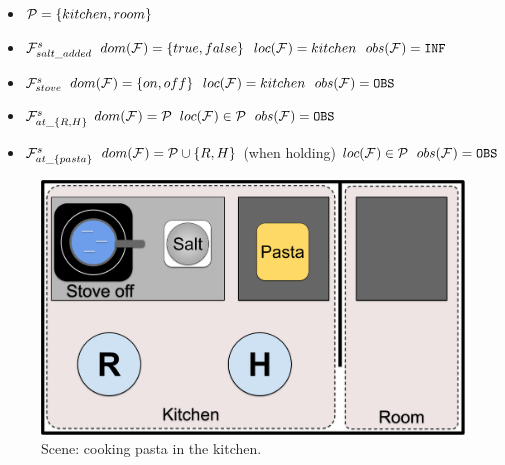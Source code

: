 \documentclass[letterpaper]{article} %
\begin{document}
\begin{itemize}
    \item $\mathcal{P} = \{ kitchen, room \}$
    
    \item $\mathcal{F}^{s}_{salt\_added}$
        \subitem $dom(\mathcal{F}^{}_{}) = \{ true, false \}$
        \subitem $loc(\mathcal{F}^{}_{}) = kitchen$
        \subitem $obs(\mathcal{F}^{}_{}) = \texttt{INF}$

    \item $\mathcal{F}^{s}_{stove}$
        \subitem $dom(\mathcal{F}^{}_{}) = \{ on, off \}$ 
        \subitem $loc(\mathcal{F}^{}_{}) = kitchen$ 
        \subitem $obs(\mathcal{F}^{}_{}) = \texttt{OBS}$ 
    
    \item $\mathcal{F}^{s}_{at\_\{R,H\}}$
        \subitem $dom(\mathcal{F}^{}_{}) = \mathcal{P}$ 
        \subitem $loc(\mathcal{F}^{}_{}) \in  \mathcal{P}$ 
        \subitem $obs(\mathcal{F}^{}_{}) = \texttt{OBS}$ 

    \item $\mathcal{F}^{s}_{at\_\{pasta\}}$
        \subitem $dom(\mathcal{F}^{}_{}) = \mathcal{P} \cup \{ R, H \}$ (when holding)
        \subitem $loc(\mathcal{F}^{}_{}) \in  \mathcal{P}$ 
        \subitem $obs(\mathcal{F}^{}_{}) = \texttt{OBS}$ 
    
\end{itemize}

\begin{figure}
    \centering
    \includegraphics[width=0.8\linewidth]{figures/scene.png}
    \caption{Scene: cooking pasta in the kitchen.}
    \label{fig:scene}
\end{figure}


\end{document}
